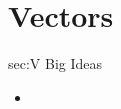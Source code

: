 \chapter{Vectors}
\label{chap:V}

\begin{bigideas}{sec:V Big Ideas}
\begin{itemize}
  \item 
\end{itemize}
\end{bigideas}